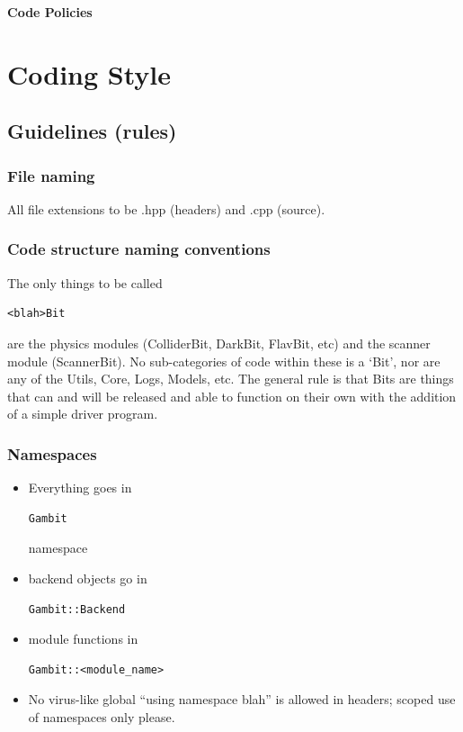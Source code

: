 

\centerline{\textbf{Code Policies}}\bigskip 

\section{Coding Style}

\subsection{Guidelines (rules)}

\subsubsection{File naming} All file extensions to be .hpp (headers) and .cpp (source).

\subsubsection{Code structure naming conventions} The only things to be called \begin{verbatim}<blah>Bit\end{verbatim} are the physics modules (ColliderBit, DarkBit, FlavBit, etc) and the scanner module (ScannerBit). No sub-categories of code within these is a `Bit', nor are any of the Utils, Core, Logs, Models, etc. The general rule is that Bits are things that can and will be released and able to function on their own with the addition of a simple driver program.

\subsubsection{Namespaces} 
\begin{itemize}
  \item Everything goes in \begin{verbatim}Gambit\end{verbatim} namespace
  \item backend objects go in \begin{verbatim}Gambit::Backend\end{verbatim}
  \item module functions in \begin{verbatim}Gambit::<module_name>\end{verbatim}
  \item No virus-like global ``using namespace blah'' is allowed in headers; scoped use of namespaces only please.
\end{itemize}

